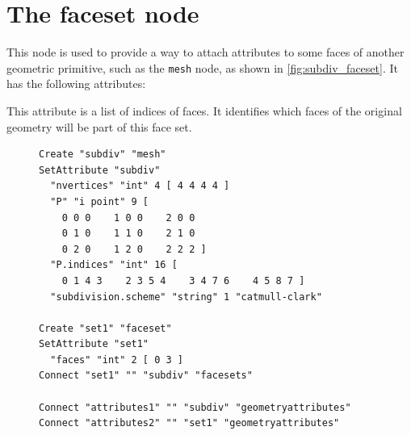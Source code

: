 \documentclass[oneside,ebook]{memoir}
\newcommand{\paramlistitemTN}[2]{\item[#2\textcolor{lightgray}{\dotfill}#1]}
\begin{document}
\section{The faceset node}
\label{section:facesetnode}
This node is used to provide a way to attach attributes to some faces of another geometric primitive, such as the \lstinline|mesh| node, as shown in \autoref{fig:subdiv_faceset}. It has the following attributes:

\begin{paramlist}
\paramlistitemTN{int}{faces}
This attribute is a list of indices of faces.
It identifies which faces of the original geometry will be part of this face set.
\end{paramlist}

\begin{figure}
\centering
\footnotesize
\begin{lstlisting}[caption={Definition of a face set on a subdivision surface},label={fig:subdiv_faceset}, frame=top, frame=bottom]
Create "subdiv" "mesh"
SetAttribute "subdiv"
  "nvertices" "int" 4 [ 4 4 4 4 ]
  "P" "i point" 9 [
    0 0 0    1 0 0    2 0 0
    0 1 0    1 1 0    2 1 0
    0 2 0    1 2 0    2 2 2 ]
  "P.indices" "int" 16 [
    0 1 4 3    2 3 5 4    3 4 7 6    4 5 8 7 ]
  "subdivision.scheme" "string" 1 "catmull-clark"

Create "set1" "faceset"
SetAttribute "set1"
  "faces" "int" 2 [ 0 3 ]
Connect "set1" "" "subdiv" "facesets"

Connect "attributes1" "" "subdiv" "geometryattributes"
Connect "attributes2" "" "set1" "geometryattributes"
\end{lstlisting}
\end{figure}
\end{document}
